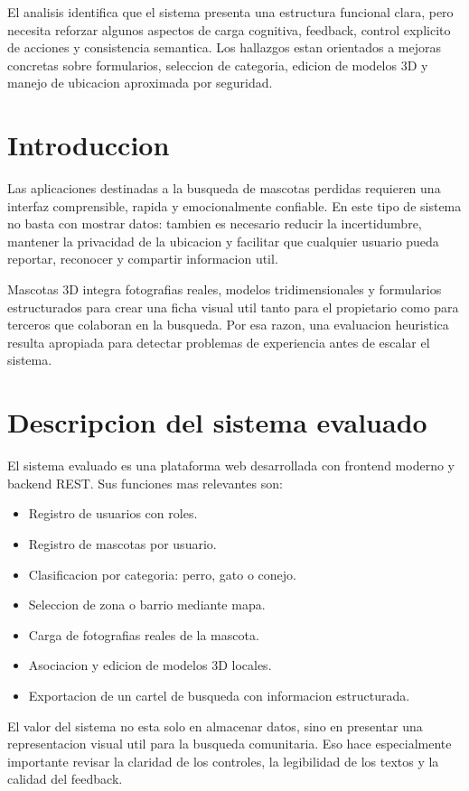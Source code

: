 \documentclass[12pt,a4paper]{article}
\begin{document}
El analisis identifica que el sistema presenta una estructura funcional clara, pero necesita reforzar algunos aspectos de carga cognitiva, feedback, control explicito de acciones y consistencia semantica. Los hallazgos estan orientados a mejoras concretas sobre formularios, seleccion de categoria, edicion de modelos 3D y manejo de ubicacion aproximada por seguridad.

\section{Introduccion}
Las aplicaciones destinadas a la busqueda de mascotas perdidas requieren una interfaz comprensible, rapida y emocionalmente confiable. En este tipo de sistema no basta con mostrar datos: tambien es necesario reducir la incertidumbre, mantener la privacidad de la ubicacion y facilitar que cualquier usuario pueda reportar, reconocer y compartir informacion util.

Mascotas 3D integra fotografias reales, modelos tridimensionales y formularios estructurados para crear una ficha visual util tanto para el propietario como para terceros que colaboran en la busqueda. Por esa razon, una evaluacion heuristica resulta apropiada para detectar problemas de experiencia antes de escalar el sistema.

\section{Descripcion del sistema evaluado}
El sistema evaluado es una plataforma web desarrollada con frontend moderno y backend REST. Sus funciones mas relevantes son:
\begin{itemize}[leftmargin=*]
  \item Registro de usuarios con roles.
  \item Registro de mascotas por usuario.
  \item Clasificacion por categoria: perro, gato o conejo.
  \item Seleccion de zona o barrio mediante mapa.
  \item Carga de fotografias reales de la mascota.
  \item Asociacion y edicion de modelos 3D locales.
  \item Exportacion de un cartel de busqueda con informacion estructurada.
\end{itemize}

El valor del sistema no esta solo en almacenar datos, sino en presentar una representacion visual util para la busqueda comunitaria. Eso hace especialmente importante revisar la claridad de los controles, la legibilidad de los textos y la calidad del feedback.
\end{document}
